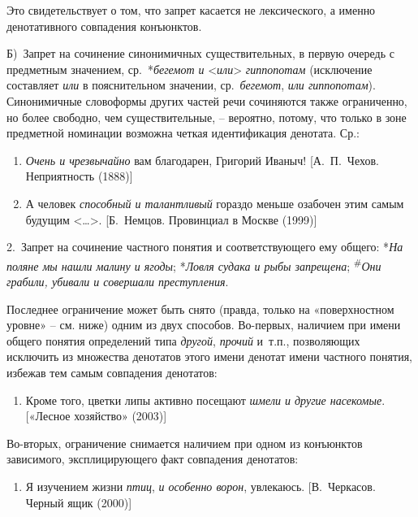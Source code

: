 Это свидетельствует о том, что запрет касается не лексического, а именно
денотативного совпадения конъюнктов.

Б)~Запрет на сочинение синонимичных существительных, в первую очередь с
предметным значением, ср.~*\emph{бегемот и}
\textless{}\emph{или}\textgreater{} \emph{гиппопотам} (исключение
составляет \emph{или} в пояснительном значении, ср.~\emph{бегемот},
\emph{или гиппопотам}). Синонимичные словоформы других частей речи
сочиняются также ограниченно, но более свободно, чем существительные, --
вероятно, потому, что только в зоне предметной номинации возможна четкая
идентификация денотата. Ср.:

\begin{enumerate}
\def\labelenumi{(\arabic{enumi})}
\setcounter{enumi}{18}
\item
  \emph{Очень и чрезвычайно} вам благодарен, Григорий Иваныч!
  {[}А.~П.~Чехов. Неприятность (1888){]}
\item
  А человек \emph{способный и талантливый} гораздо меньше озабочен этим
  самым будущим \textless\ldots\textgreater. {[}Б.~Немцов. Провинциал в
  Москве (1999){]}
\end{enumerate}

2.~Запрет на сочинение частного понятия и соответствующего ему общего:
*\emph{На поляне мы нашли малину и ягоды}; *\emph{Ловля судака и рыбы
запрещена}; \textsuperscript{\#}\emph{Они грабили, убивали и совершали
преступления}.

Последнее ограничение может быть снято (правда, только на «поверхностном
уровне» -- см. ниже) одним из двух способов. Во-первых, наличием при
имени общего понятия определений типа \emph{другой}, \emph{прочий}
и~т.п., позволяющих исключить из множества денотатов этого имени денотат
имени частного понятия, избежав тем самым совпадения денотатов:

\begin{enumerate}
\def\labelenumi{(\arabic{enumi})}
\setcounter{enumi}{20}
\item
  Кроме того, цветки липы активно посещают \emph{шмели и другие
  насекомые}. {[}«Лесное хозяйство» (2003){]}
\end{enumerate}

Во-вторых, ограничение снимается наличием при одном из конъюнктов
зависимого, эксплицирующего факт совпадения денотатов:

\begin{enumerate}
\def\labelenumi{(\arabic{enumi})}
\setcounter{enumi}{21}
\item
  Я изучением жизни \emph{птиц}, \emph{и особенно ворон}, увлекаюсь.
  {[}В.~Черкасов. Черный ящик (2000){]}
\end{enumerate}

